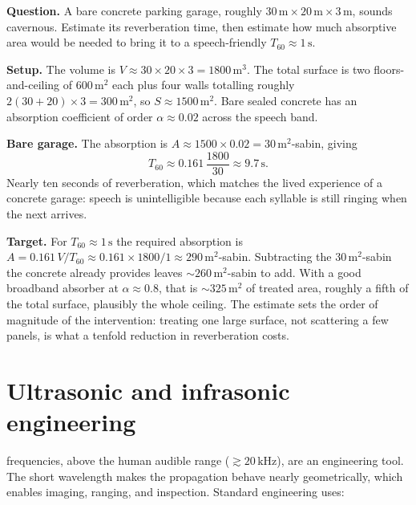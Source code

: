 \begin{estimation}
\textbf{Question.} A bare concrete parking garage, roughly
$30\,\si{\meter}\times20\,\si{\meter}\times3\,\si{\meter}$, sounds
cavernous. Estimate its reverberation time, then estimate how much
absorptive area would be needed to bring it to a speech-friendly
$T_{60}\approx 1\,\si{\second}$.

\textbf{Setup.} The volume is $V \approx 30\times20\times3 =
1800\,\si{\meter\cubed}$. The total surface is two floors-and-ceiling
of $600\,\si{\meter\squared}$ each plus four walls totalling roughly
$2(30+20)\times3 = 300\,\si{\meter\squared}$, so
$S \approx 1500\,\si{\meter\squared}$. Bare sealed concrete has an
absorption coefficient of order $\alpha \approx 0.02$ across the speech
band.

\textbf{Bare garage.} The absorption is
$A \approx 1500\times 0.02 = 30\,\si{\meter\squared}$-sabin, giving
\[
T_{60} \approx 0.161\,\frac{1800}{30} \approx 9.7\,\si{\second}.
\]
Nearly ten seconds of reverberation, which matches the lived
experience of a concrete garage: speech is unintelligible because each
syllable is still ringing when the next arrives.

\textbf{Target.} For $T_{60}\approx 1\,\si{\second}$ the required
absorption is $A = 0.161\,V/T_{60} \approx 0.161\times 1800/1 \approx
290\,\si{\meter\squared}$-sabin. Subtracting the
$30\,\si{\meter\squared}$-sabin the concrete already provides leaves
$\sim 260\,\si{\meter\squared}$-sabin to add. With a good broadband
absorber at $\alpha\approx 0.8$, that is $\sim 325\,\si{\meter\squared}$
of treated area, roughly a fifth of the total surface, plausibly the
whole ceiling. The estimate sets the order of magnitude of the
intervention: treating one large surface, not scattering a few panels,
is what a tenfold reduction in reverberation costs.
\end{estimation}

\section{Ultrasonic and infrasonic engineering}

 frequencies, above the human audible range
($\gtrsim 20\,\si{\kilo\hertz}$), are an engineering tool. The
short wavelength makes the propagation behave nearly geometrically,
which enables imaging, ranging, and inspection. Standard
engineering uses:

